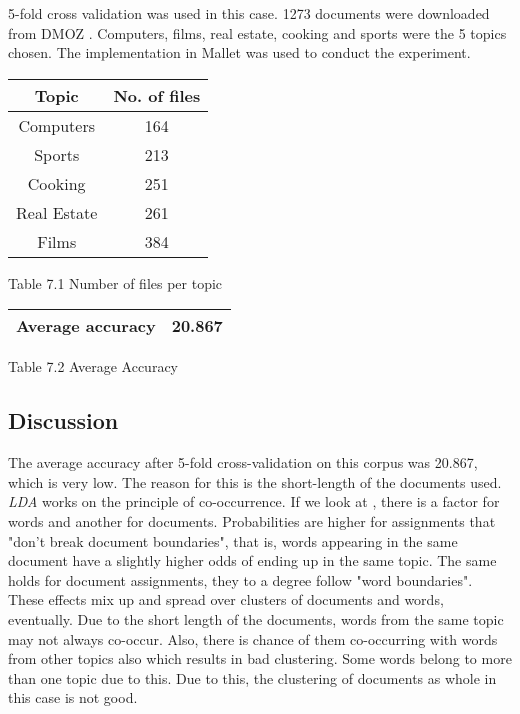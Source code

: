 5-fold cross validation was used in this case. 1273 documents were downloaded from DMOZ \citep*{dmoz}. Computers, films, real estate, cooking and
sports were the 5 topics chosen. The implementation in Mallet was used to conduct the experiment.

\begin{center}
\begin{tabular}{ |c|c| }
  \hline
  Topic & No. of files \\ \hline
  Computers & 164 \\ \hline
  Sports & 213 \\ \hline
  Cooking & 251 \\ \hline
  Real Estate & 261 \\ \hline
  Films & 384 \\ \hline
\end{tabular}
\end{center}
\begin{center}
 Table 7.1 Number of files per topic
\end{center}

\begin{center}
\begin{tabular}{ |c|c| }
  \hline
  Average accuracy & 20.867 \\ \hline
\end{tabular}
\end{center}
\begin{center}
 Table 7.2 Average Accuracy 
\end{center}

\subsection*{Discussion}

\par
The average accuracy after 5-fold cross-validation on this corpus was 20.867, which is very low. The reason for this is the short-length
of the documents used. \textit{LDA} works on the principle of co-occurrence. If we look at , there is a
factor for words and another for documents. Probabilities are higher for assignments that "don't break document boundaries", that is, words 
appearing in the same document have a slightly higher odds of ending up in the same topic. The same holds for document assignments, they to 
a degree follow "word boundaries". These effects mix up and spread over clusters of documents and words, eventually. Due to the short length 
of the documents, words from the same topic may not always co-occur. Also, there is chance of them co-occurring with words from other topics 
also which results in bad clustering. Some words belong to more than one topic due to this. Due to this, the clustering of documents as whole 
in this case is not good. 

